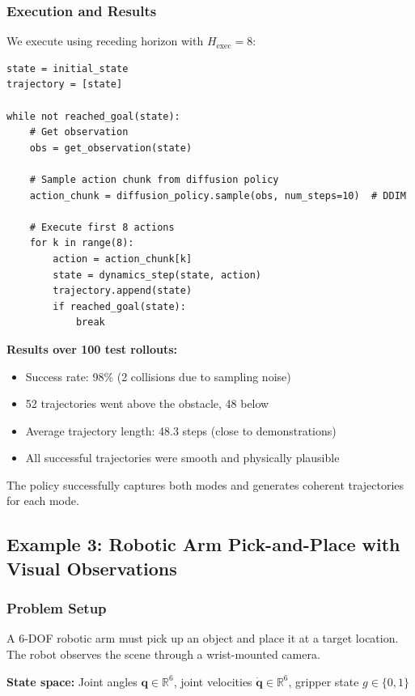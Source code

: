 \subsubsection{Execution and Results}

We execute using receding horizon with $H_{\text{exec}} = 8$:

\begin{verbatim}
state = initial_state
trajectory = [state]

while not reached_goal(state):
    # Get observation
    obs = get_observation(state)

    # Sample action chunk from diffusion policy
    action_chunk = diffusion_policy.sample(obs, num_steps=10)  # DDIM

    # Execute first 8 actions
    for k in range(8):
        action = action_chunk[k]
        state = dynamics_step(state, action)
        trajectory.append(state)
        if reached_goal(state):
            break
\end{verbatim}

\textbf{Results over 100 test rollouts:}
\begin{itemize}
    \item Success rate: 98\% (2 collisions due to sampling noise)
    \item 52 trajectories went above the obstacle, 48 below
    \item Average trajectory length: 48.3 steps (close to demonstrations)
    \item All successful trajectories were smooth and physically plausible
\end{itemize}

The policy successfully captures both modes and generates coherent trajectories for each mode.

\subsection{Example 3: Robotic Arm Pick-and-Place with Visual Observations}
\label{subsec:example_pick_place}

\subsubsection{Problem Setup}

A 6-DOF robotic arm must pick up an object and place it at a target location. The robot observes the scene through a wrist-mounted camera.

\textbf{State space:} Joint angles $\mathbf{q} \in \mathbb{R}^6$, joint velocities $\dot{\mathbf{q}} \in \mathbb{R}^6$, gripper state $g \in \{0, 1\}$

